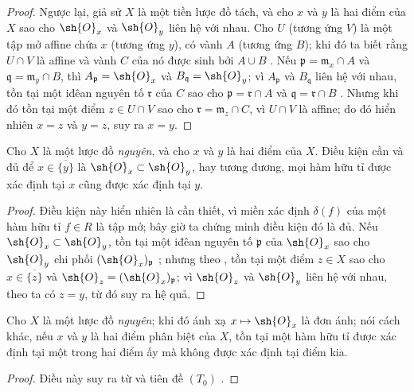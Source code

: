 \documentclass[oneside]{amsart}
\makeatletter
\newcommand{\ega@arrow}[2]{\mathchoice{#1}{#2}{#2}{#2}}
\let\ega@shortmapsto\mapsto
\renewcommand{\mapsto}{\ega@arrow{\longmapsto}{\ega@shortmapsto}}
\let\EGAOriginalLabel\label
\renewcommand{\label}[1]{\phantomsection\EGAOriginalLabel{#1}}
\makeatother
\begin{document}
\begin{proof}
Ngược lại, giả sử $X$ là một tiền lược đồ tách, và cho $x$ và $y$ là hai điểm của $X$ sao cho $\sh{O}_x$ và $\sh{O}_y$ liên hệ với nhau.
Cho $U$ (tương ứng $V$) là một tập mở affine chứa $x$ (tương ứng $y$), có vành $A$ (tương ứng $B$);
khi đó ta biết rằng $U\cap V$ là affine và vành $C$ của nó được sinh bởi $A\cup B$ .
Nếu $\mathfrak{p}=\mathfrak{m}_x\cap A$ và $\mathfrak{q}=\mathfrak{m}_y\cap B$, thì $A_{\mathfrak{p}}=\sh{O}_x$ và $B_{\mathfrak{q}}=\sh{O}_y$; vì $A_{\mathfrak{p}}$ và $B_{\mathfrak{q}}$ liên hệ với nhau, tồn tại một iđêan nguyên tố $\mathfrak{r}$ của $C$ sao cho $\mathfrak{p}=\mathfrak{r}\cap A$ và $\mathfrak{q}=\mathfrak{r}\cap B$ .
Nhưng khi đó tồn tại một điểm $z\in U\cap V$ sao cho $\mathfrak{r}=\mathfrak{m}_z\cap C$, vì $U\cap V$ là affine; do đó hiển nhiên $x=z$ và $y=z$, suy ra $x=y$.
\end{proof}

\begin{corollary}[8.2.3]
\label{I.8.2.3}
Cho $X$ là một lược đồ \emph{nguyên}, và cho $x$ và $y$ là hai điểm của $X$.
Điều kiện cần và đủ để $x\in\overline{\{y\}}$ là
$\sh{O}_x\subset\sh{O}_y$, hay tương đương, mọi hàm hữu tỉ được xác định
tại $x$ cũng được xác định tại $y$.
\end{corollary}

\begin{proof}
Điều kiện này hiển nhiên là cần thiết, vì miền xác định
$\delta(f)$ của một hàm hữu tỉ $f\in R$ là tập mở; bây giờ ta chứng minh
điều kiện đó là đủ.
Nếu $\sh{O}_x\subset\sh{O}_y$, tồn tại một iđêan nguyên tố $\mathfrak{p}$
của $\sh{O}_x$ sao cho $\sh{O}_y$ chi phối
$(\sh{O}_x)_{\mathfrak{p}}$ ; nhưng theo , tồn tại
một điểm $z\in X$ sao cho $x\in\overline{\{z\}}$ và
$\sh{O}_z=(\sh{O}_x)_{\mathfrak{p}}$; vì $\sh{O}_z$ và $\sh{O}_y$ liên hệ
với nhau, theo  ta có $z=y$, từ đó suy ra hệ quả.
\end{proof}

\begin{corollary}[8.2.4]
\label{I.8.2.4}
Cho $X$ là một lược đồ \emph{nguyên}; khi đó ánh xạ $x\mapsto\sh{O}_x$ là đơn ánh; nói cách khác, nếu $x$ và $y$ là hai điểm phân biệt của $X$, tồn tại một hàm hữu tỉ được xác định tại một trong hai điểm ấy mà không được xác định tại điểm kia.
\end{corollary}

\begin{proof}
Điều này suy ra từ  và tiên đề $(T_0)$ .
\end{proof}
\end{document}
